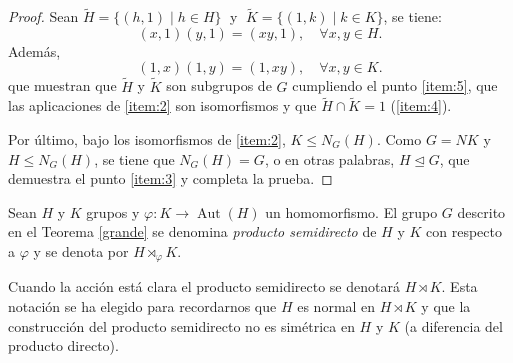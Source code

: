 \begin{proof}
Sean $\widetilde{H}=\{(h,1) \mid h \in H \}\; $ y  $ \;\widetilde{K}=\{(1,k) \mid k \in K \}$, se tiene:
\[
    (x,1)(y,1)=(xy,1), \quad \forall x, y \in H .
\]
Además, 
\[
    (1,x)(1,y) = (1,xy), \quad \forall x, y \in K .
\]
que muestran que $\widetilde{H}$ y $\widetilde{K}$ son subgrupos de $G$ cumpliendo el punto \ref{item:5}, que las aplicaciones de \ref{item:2} son isomorfismos y que $\widetilde{H} \cap \widetilde{K}=1$ (\ref{item:4}).


Por último, bajo los isomorfismos de \ref{item:2}, $K \leq N_G(H)$. Como $G=NK$ y $H \leq N_G(H)$, se tiene que $N_G(H) = G$, o en otras palabras, $H\trianglelefteq G$, que demuestra el punto \ref{item:3} y completa la prueba.
\end{proof}



\begin{definition} \label{11}
    Sean $H$ y $K$ grupos y $\varphi \colon K \rightarrow \operatorname{Aut}(H)$ un homomorfismo. El grupo $G$ descrito en el Teorema \ref{grande} se denomina \textit{producto semidirecto} de $H$ y $K$ con respecto a $\varphi$ y se denota por $H \rtimes_{\varphi} K$.

\end{definition}

\begin{remark}
Cuando la acción está clara el producto semidirecto se denotará $H \rtimes K$. 
Esta notación se ha elegido para recordarnos que $H$ es normal en $H \rtimes K$ y que la construcción del producto semidirecto no es simétrica en $H$ y $K$ (a diferencia del producto directo). 
\end{remark}





